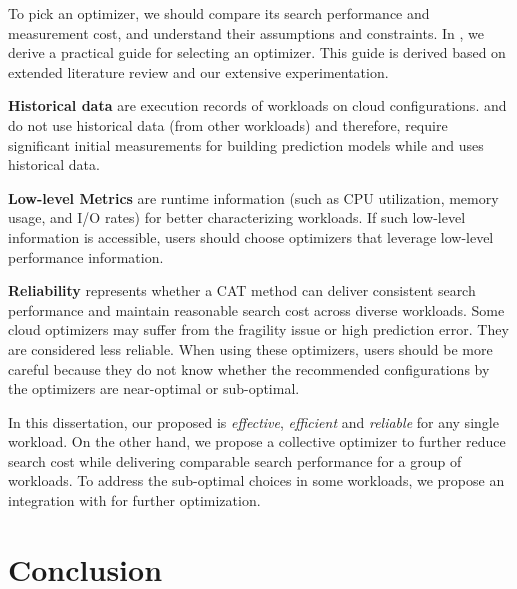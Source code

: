 To pick an optimizer, we should compare its search performance and measurement cost, and understand their assumptions and constraints.
In \mytable{~\ref{tab:cat_guide}}, we derive a practical guide
for selecting an optimizer.
This guide is derived based on extended literature review and our extensive experimentation.

\textbf{Historical data} are execution records of workloads on cloud configurations.
\cherrypick and \arrow do not use historical data (from other workloads) and therefore, require significant initial measurements for 
building prediction models while
\paris and \scout uses historical data.

\textbf{Low-level Metrics} are runtime information (such as CPU utilization, memory usage, and I/O rates) for better characterizing
workloads.
If such low-level information is accessible, users should choose optimizers that leverage low-level performance information.

\textbf{Reliability} 
represents whether a CAT method can deliver consistent search performance and maintain reasonable search cost
across diverse workloads.
Some cloud optimizers may suffer from
the fragility issue or high prediction error.
They are considered less reliable.
When using these optimizers, users should be more careful
because they do not know whether the recommended configurations by the optimizers are near-optimal or sub-optimal.

In this dissertation, our proposed \scout is \textit{effective}, \textit{efficient} and \textit{reliable}
for any single workload.
On the other hand, we propose a collective optimizer \micky to further reduce search cost while delivering comparable search performance for a group of workloads.
To address the sub-optimal choices in some workloads, we propose an integration with \scout for further optimization.




\section{Conclusion}

